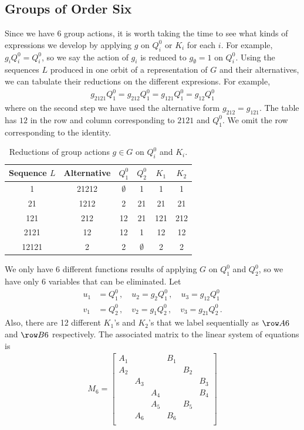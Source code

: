 \subsection{Groups of Order Six}
Since we have 6 group actions, it is worth taking the time to see what kinds of expressions we develop by applying $g$ on $Q_i^0$ or $K_i$ for each $i$. For example, $g_i Q_i^0 = Q_i^0$, so we say the action of $g_i$ is reduced to $g_{\emptyset} = 1$ on $Q_i^0$. Using the sequences $L$ produced in one orbit of a representation of $G$ and their alternatives, we can tabulate their reductions on the different expresions. For example,
\begin{align}
g_{2121}Q_1^0 = g_{212}Q_1^0 = g_{121} Q_1^0 = g_{12}Q_1^0
\end{align}
where on the second step we have used the alternative form $g_{212} = g_{121}$. The table has $12$  in the row and column corresponding to $2121$ and $Q_1^0$. We omit the row corresponding to the identity.
\begin{table}[H]
    \caption{Reductions of group actions $g \in G$ on $Q_i^0$ and $K_i$.}
    \label{tbl:tableG6}
    \centering
    \begin{tabular}{cccccc}
    \toprule
    Sequence $L$ & Alternative & $Q_1^0$ & $Q_2^0$ & $K_1$ & $K_2$ \\ 
    \midrule
    1 & 21212 & $\emptyset$ & 1& 1& 1 \\
    21 &  1212& 2& 21 & 21& 21  \\
    121 & 212 & 12& 21& 121& 212 \\
    2121 & 12 &  12 & 1 & 12 & 12 \\
    12121 & 2 &  2& $\emptyset$& 2& 2 \\
    \bottomrule
    \end{tabular}
\end{table}
We only have 6 different functions results of applying $G$ on $Q_1^0$ and $Q_2^0$, so we have only 6 variables that can be eliminated.  Let
\begin{align}
	u_1 &= Q_1^0\,,\quad u_2 = g_2 Q_1^0\,,\quad u_3 = g_{12}Q_1^0\\
	v_1 &= Q_2^0\,,\quad v_2 = g_1 Q_2^0\,,\quad v_3 = g_{21}Q_2^0\,.
\end{align}
Also, there are 12 different $K_1$'s and $K_2$'s that we label sequentially as $\row A6$ and $\row B6$ respectively. The associated matrix to the linear system of equations is
\begin{align}
	M_6 = \begin{bmatrix}
	A_1& & & B_1 & & \\
	A_2& & & & B_2& \\
	& A_3& & & & B_3\\
	& & A_4 & & & B_4\\
	& & A_5& & B_5& \\
	&A_6 & &B_6 & & \\
	\end{bmatrix}
\end{align}
